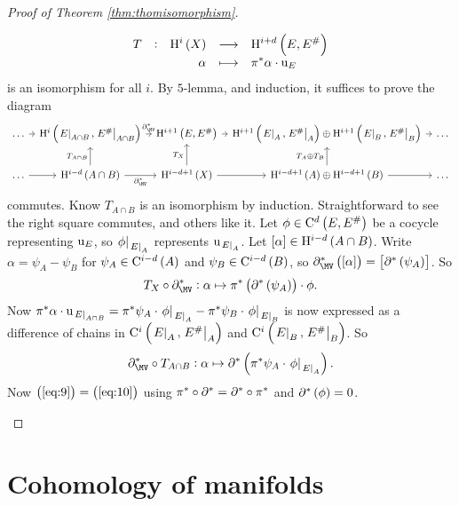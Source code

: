 \begin{proof}[Proof of Theorem \ref{thm:thomisomorphism}]
\begin{itemize}
$$ \function[T]{\H^i\br{X}}{\H^{i + d}\br{E, E^\#}}{\alpha}{\pi^*\alpha \cdot \u_E} $$
is an isomorphism for all $ i $. By $ 5 $-lemma, and induction, it suffices to prove the diagram
$$
\begin{tikzcd}[column sep=tiny]
\dots \arrow{r} & \H^i\br{\eval{E}_{A \cap B}, \eval{E^\#}_{A \cap B}} \arrow{r}{\da_{\MV}^*} & \H^{i + 1}\br{E, E^\#} \arrow{r} & \H^{i + 1}\br{\eval{E}_A, \eval{E^\#}_A} \oplus \H^{i + 1}\br{\eval{E}_B, \eval{E^\#}_B} \arrow{r} & \dots \\
\dots \arrow{r} & \H^{i - d}\br{A \cap B} \arrow{u}{T_{A \cap B}} \arrow{r}[swap]{\da_{\MV}^*} & \H^{i - d + 1}\br{X} \arrow{u}{T_X} \arrow{r} & \H^{i - d + 1}\br{A} \oplus \H^{i - d + 1}\br{B} \arrow{u}{T_A \oplus T_B} \arrow{r} & \dots
\end{tikzcd}
$$
commutes. Know $ T_{A \cap B} $ is an isomorphism by induction. Straightforward to see the right square commutes, and others like it. Let $ \phi \in \C^d\br{E, E^\#} $ be a cocycle representing $ \mathrm{u}_E $, so $ \left. \phi \right|_{\left. E \right|_A} $ represents $ \mathrm{u}_{\left. E \right|_A} $. Let $ \sbr{\alpha} \in \H^{i - d}\br{A \cap B} $. Write $ \alpha = \psi_A - \psi_B $ for $ \psi_A \in \C^{i - d}\br{A} $ and $ \psi_B \in \C^{i - d}\br{B} $, so $ \da_{\MV}^*\br{\sbr{\alpha}} = \sbr{\da^*\br{\psi_A}} $. So
\begin{equation}
\label{eq:9}
T_X \circ \da_{\MV}^* : \alpha \mapsto \pi^*\br{\da^*\br{\psi_A}} \cdot \phi.
\end{equation}
Now $ \pi^*\alpha \cdot \mathrm{u}_{\left. E \right|_{A \cap B}} = \pi^*\psi_A \cdot \left. \phi \right|_{\left. E \right|_A} - \pi^*\psi_B \cdot \left. \phi \right|_{\left. E \right|_B} $ is now expressed as a difference of chains in $ \C^i\br{\eval{E}_A, \eval{E^\#}_A} $ and $ \C^i\br{\eval{E}_B, \eval{E^\#}_B} $. So
\begin{equation}
\label{eq:10}
\da_{\MV}^* \circ T_{A \cap B} : \alpha \mapsto \da^*\br{\pi^*\psi_A \cdot \eval{\phi}_{\eval{E}_A}}.
\end{equation}
Now $ \br{\ref{eq:9}} = \br{\ref{eq:10}} $ using $ \pi^* \circ \partial^* = \partial^* \circ \pi^* $ and $ \da^*\br{\phi} = 0 $.
\end{itemize}
\end{proof}

\pagebreak

\section{Cohomology of manifolds}


